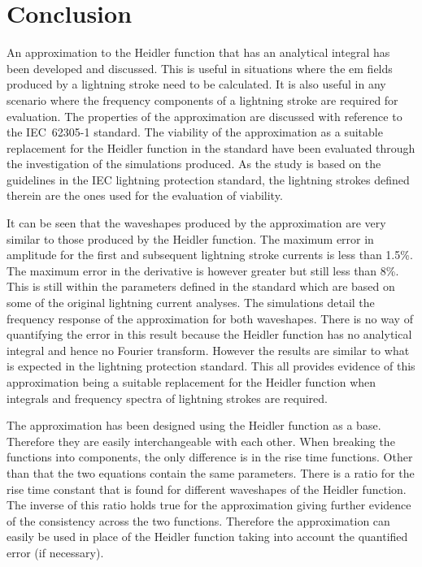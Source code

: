 
\chapter{Conclusion} %

\label{ChapterConclusion} %


An approximation to the Heidler function that has an analytical integral has been developed and discussed. This is useful in situations where the \gls{em} fields produced by a lightning stroke need to be calculated. It is also useful in any scenario where the frequency components of a lightning stroke are required for evaluation. The properties of the approximation are discussed with reference to the IEC~62305-1 standard. The viability of the approximation as a suitable replacement for the Heidler function in the standard have been evaluated through the investigation of the simulations produced. As the study is based on the guidelines in the IEC lightning protection standard, the lightning strokes defined therein are the ones used for the evaluation of viability.

It can be seen that the waveshapes produced by the approximation are very similar to those produced by the Heidler function. The maximum error in amplitude for the first and subsequent lightning stroke currents is less than 1.5\%. The maximum error in the derivative is however greater but still less than 8\%. This is still within the parameters defined in the standard which are based on some of the original lightning current analyses. The simulations detail the frequency response of the approximation for both waveshapes. There is no way of quantifying the error in this result because the Heidler function has no analytical integral and hence no Fourier transform. However the results are similar to what is expected in the lightning protection standard. This all provides evidence of this approximation being a suitable replacement for the Heidler function when integrals and frequency spectra of lightning strokes are required.

The approximation has been designed using the Heidler function as a base. Therefore they are easily interchangeable with each other. When breaking the functions into components, the only difference is in the rise time functions. Other than that the two equations contain the same parameters. There is a ratio for the rise time constant that is found for different waveshapes of the Heidler function. The inverse of this ratio holds true for the approximation giving further evidence of the consistency across the two functions. Therefore the approximation can easily be used in place of the Heidler function taking into account the quantified error (if necessary).

